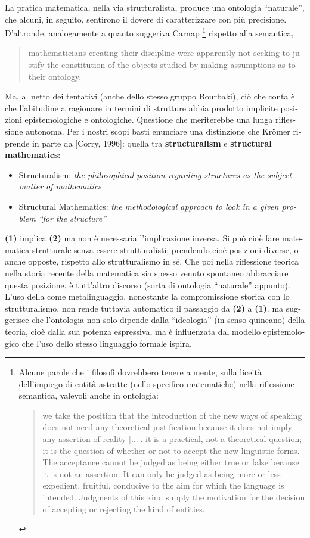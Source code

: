 \begin{italian}
La pratica matematica, nella via strutturalista, produce una ontologia ``naturale'', che alcuni, in seguito, sentirono il dovere di caratterizzare con più precisione. D'altronde, analogamente a quanto suggeriva Carnap \footnote{Alcune parole che i filosofi dovrebbero tenere a mente, sulla liceità dell'impiego di entità astratte (nello specifico matematiche) nella riflessione semantica, valevoli anche in ontologia:
	\begin{quote}
		we take the position that the introduction of the new ways of speaking does not need any theoretical justification because it does not imply any assertion of reality [...].  it is a practical, not a theoretical question; it is the question of whether or not to accept the new linguistic forms. The acceptance cannot be judged as being either true or false because it is not an assertion. It can only be judged as being more or less expedient, fruitful, conducive to the aim for which the language is intended. Judgments of this kind supply the motivation for the decision of accepting or rejecting the kind of entities. \hfill \cite{carnap1956meaning}
	\end{quote}} rispetto alla semantica,
\begin{quote}
	mathematicians creating their discipline were apparently not seeking to justify the constitution of the	objects studied by making assumptions as to their ontology.\hfill  \cite{kromer2007tool}
\end{quote}
Ma, al netto dei tentativi (anche dello stesso gruppo Bourbaki), ciò che conta è che l'abitudine a ragionare in termini di strutture abbia prodotto implicite posizioni epistemologiche e ontologiche.
Questione che meriterebbe una lunga riflessione autonoma. Per i nostri scopi basti enunciare una distinzione che Kr\"omer riprende in parte da [Corry, 1996]: quella tra \textbf{structuralism} e \textbf{structural mathematics}:
\begin{itemize}
	\item[\textbf{(1)}] Structuralism: \textit{the philosophical
		      position regarding structures as the subject matter of mathematics}
	\item[\textbf{(2)}] Structural Mathematics: \textit{the methodological approach to look in a given problem
		      “for the structure”}
\end{itemize}
\begin{remark}
	\textbf{(1)} implica \textbf{(2)} ma non è necessaria l'implicazione inversa. Si può cioè fare matematica strutturale senza essere strutturalisti; prendendo cioè posizioni diverse, o anche opposte, rispetto allo strutturalismo in sé. Che poi nella riflessione teorica nella storia recente della matematica sia spesso venuto spontaneo abbracciare questa posizione, è tutt'altro discorso (sorta di ontologia ``naturale'' appunto). L'uso della \CT come metalinguaggio, nonostante la compromissione storica con lo strutturalismo, non rende tuttavia automatico il passaggio da \textbf{(2)} a \textbf{(1)}. ma suggerisce che l'ontologia non solo dipende dalla ``ideologia'' (in senso quineano) della teoria, cioè dalla sua potenza espressiva, ma è influenzata dal modello epistemologico che l'uso dello stesso linguaggio formale ispira.

\end{remark}
\end{italian}
